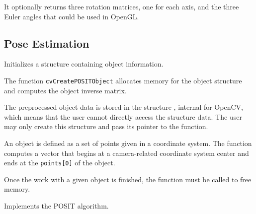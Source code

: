 It optionally returns three rotation matrices, one for each axis, and the three Euler angles that could be used in OpenGL.


\subsection{Pose Estimation}


\label{CreatePOSITObject}

Initializes a structure containing object information.


\begin{description}
\end{description}

The function \texttt{cvCreatePOSITObject} allocates memory for the object structure and computes the object inverse matrix.

The preprocessed object data is stored in the structure , internal for OpenCV, which means that the user cannot directly access the structure data. The user may only create this structure and pass its pointer to the function.

An object is defined as a set of points given in a coordinate system. The function  computes a vector that begins at a camera-related coordinate system center and ends at the \texttt{points[0]} of the object.

Once the work with a given object is finished, the function  must be called to free memory.

\label{POSIT}

Implements the POSIT algorithm.


